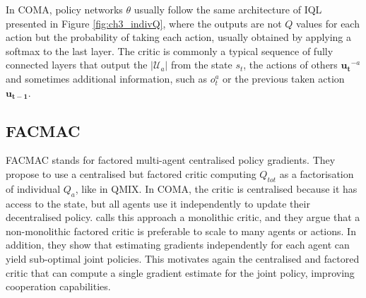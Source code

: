 In COMA, policy networks $\theta$ usually follow the same architecture of IQL presented in Figure \ref{fig:ch3_indivQ}, where the outputs are not $Q$ values for each action but the probability of taking each action, usually obtained by applying a softmax to the last layer.
The critic is commonly a typical sequence of fully connected layers that output the $|\mathcal{U}_a|$ from the state $s_t$, the actions of others $\mathbf{u_t}^{-a}$ and sometimes additional information, such as $o_t^a$ or the previous taken action $\mathbf{u_{t-1}}$.

\subsection{FACMAC}

FACMAC \citep{peng2021facmac} stands for factored multi-agent centralised policy gradients.
They propose to use a centralised but factored critic computing $Q_{tot}$ as a factorisation of individual $Q_a$, like in QMIX.
In COMA, the critic is centralised because it has access to the state, but all agents use it independently to update their decentralised policy.
\cite{peng2021facmac} calls this approach a monolithic critic, and they argue that a non-monolithic factored critic is preferable to scale to many agents or actions.
In addition, they show that estimating gradients independently for each agent can yield sub-optimal joint policies.
This motivates again the centralised and factored critic that can compute a single gradient estimate for the joint policy, improving cooperation capabilities.

